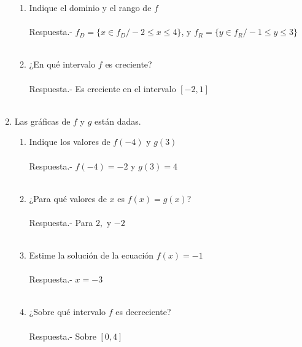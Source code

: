 \begin{enumerate}
\begin{enumerate}[\bfseries (a)]
		    \item Indique el dominio y el rango de $f$\\\\
		    Respuesta.-\; $f_D=\lbrace x \in f_D / -2 \leq x \leq 4 \rbrace$, y $f_R=\lbrace y \in f_R / -1 \leq y \leq 3 \rbrace$\\\\

		    \item ¿En qué intervalo $f$ es creciente?\\\\
		    Respuesta.-\; Es creciente en el intervalo $[-2,1]$\\\\ 

	    \end{enumerate}

    \item Las gráficas de $f$ y $g$ están dadas.

	\begin{enumerate}[\bfseries (a)]

	    \item Indique los valores de $f(-4)$ y $g(3)$\\\\
		Respuesta.-\; $f(-4)=-2$ y $g(3)=4$\\\\

	    \item ¿Para qué valores de $x$ es $f(x)=g(x)$?\\\\
		Respuesta.-\; Para $2,$ y $-2$\\\\ 

	    \item Estime la solución de la ecuación $f(x)=-1$\\\\
		Respuesta.-\; $x=-3$\\\\

	    \item ¿Sobre qué intervalo $f$ es decreciente?\\\\ 
		Respuesta.-\; Sobre $[0,4]$\\\\


\end{enumerate}
\end{enumerate}
